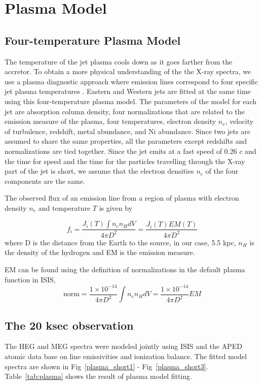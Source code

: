 \chapter{Plasma Model}
\section{Four-temperature Plasma Model}
The temperature of the jet plasma cools down as it goes farther from the accretor. To obtain a more physical understanding of the the X-ray spectra, we use a plasma diagnostic approach where emission lines correspond to four specific jet plasma temperatures \citep{Marshall2002}. Eastern and Western jets are fitted at the same time using this four-temperature plasma model. The parameters of the model for each jet are absorption column density, four normalizations that are related to the emission measure of the plasma, four temperatures, electron density $n_e$, velocity of turbulence, redshift, metal abundance, and Ni abundance. Since two jets are assumed to share the same properties, all the parameters except redshifts and normalizations are tied together. Since the jet emits at a fast  speed of 0.26 $c$ and the time for speed and the time for the particles travelling through the X-ray part of the jet is short, we assume that the electron densities $n_e$ of the four components are the same. \par 

The observed flux of an emission line from a region of plasma with electron density $n_e$ and temperature $T$ is given by

\begin{equation*}
    f_i = \dfrac{J_i(T)\int n_en_H dV }{4\pi D^2} = \dfrac{J_i(T)EM(T)}{4\pi D^2}
\end{equation*}
where D is the distance from the Earth to the source, in our case, 5.5 kpc, $n_H$ is the density of the hydrogen and EM is the emission measure.\par 

EM can be found using the definition of normalizations in the default plasma function in ISIS,
\begin{equation*}
    \mathrm{norm} = \dfrac{1\times 10^{-14}}{4\pi D^2}\int n_e n_H dV =  \dfrac{1\times 10^{-14}}{4\pi D^2} EM
\end{equation*}




\section{The 20 ksec observation}
The HEG and MEG spectra were modeled jointly using ISIS and the APED atomic data base on line emissivities and ionization balance. The fitted model spectra are shown in Fig~\ref{plasma_short1} - Fig~\ref{plasma_short3}. Table~\ref{tab:plasma} shows the result of plasma model fitting.\par 


